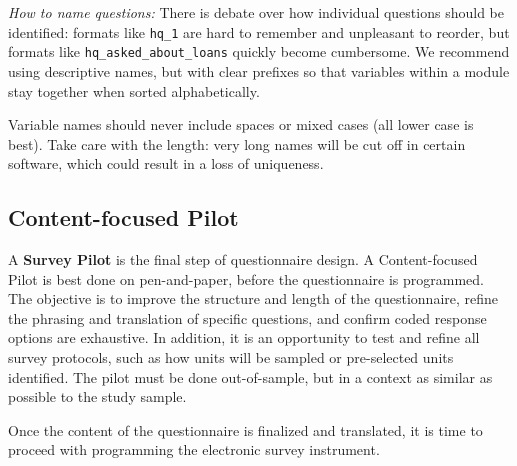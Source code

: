 \textit{How to name questions:}
There is debate over how individual questions should be identified: formats like \texttt{hq\_1} are hard to remember and unpleasant to reorder, but formats like \texttt{hq\_asked\_about\_loans} quickly become cumbersome.
We recommend using descriptive names, but with clear prefixes so that variables within a module stay together when sorted alphabetically. { Variable names should never include spaces or mixed cases (all lower case is best). Take care with the length: very long names will be cut off in certain software, which could result in a loss of uniqueness. 

\subsection{Content-focused Pilot}
A \textbf{Survey Pilot}  is the final step of questionnaire design. 
A Content-focused Pilot   is best done on pen-and-paper, before the questionnaire is programmed. 
The objective is to improve the structure and length of the questionnaire, refine the phrasing and translation of specific questions, and confirm coded response options are exhaustive. 
In addition, it is an opportunity to test and refine all survey protocols, such as how units will be sampled or pre-selected units identified. The pilot must be done out-of-sample, but in a context as similar as possible to the study sample.

Once the content of the questionnaire is finalized and translated, it is time to proceed with programming the electronic survey instrument.


}
